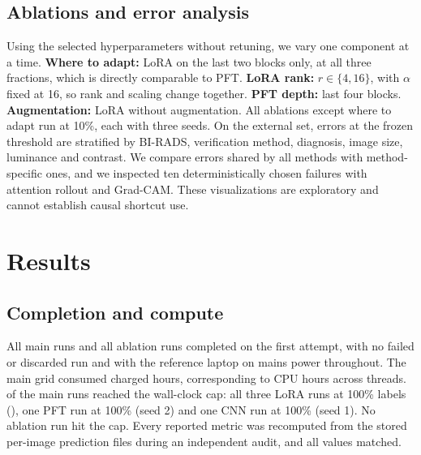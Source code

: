 \documentclass[conference,a4paper]{IEEEtran}
\begin{document}
\subsection{Ablations and error analysis}

Using the selected hyperparameters without retuning, we vary one component at a
time. \textbf{Where to adapt:} LoRA on the last two blocks only, at all three
fractions, which is directly comparable to PFT. \textbf{LoRA rank:} $r \in
\{4, 16\}$, with $\alpha$ fixed at 16, so rank and scaling change together.
\textbf{PFT depth:} last four blocks. \textbf{Augmentation:} LoRA without
augmentation. All ablations except where to adapt run at 10\%, each with three
seeds. On the external set, errors at the frozen threshold are stratified by
BI-RADS, verification method, diagnosis, image size, luminance and contrast. We
compare errors shared by all methods with method-specific ones, and we inspected
ten deterministically chosen failures with attention rollout and Grad-CAM. These
visualizations are exploratory and cannot establish causal shortcut use.

\section{Results}
\label{sec:results}

\begin{table}[!t]
\caption{Main grid: mean $\pm$ SD over three seeds, with 95\% class-stratified
paired bootstrap intervals of the mean. ``in'' is the internal (BUSI) test set,
``out'' the external (BrEaST) cohort. Gap is
$\mathrm{AUC}_{\mathrm{in}} - \mathrm{AUC}_{\mathrm{out}}$.}
\label{tab:main}
\centering

\end{table}

\subsection{Completion and compute}

All \valRunsMain main runs and all \valRunsAblation ablation runs completed on
the first attempt, with no failed or discarded run and with the reference laptop
on mains power throughout. The main grid consumed \valComputeMainChargedHours
charged hours, corresponding to \valComputeMainCpuHours CPU hours across
\valProtocolThreads threads. \valRunsCapHits of the \valRunsMain main runs
reached the wall-clock cap: all three LoRA runs at 100\% labels
(\valCostLoRAHundredCapHit), one PFT run at 100\% (seed 2) and one CNN run at
100\% (seed 1). No ablation run hit the cap. Every reported metric was
recomputed from the stored per-image prediction files during an independent
audit, and all values matched.
\end{document}
